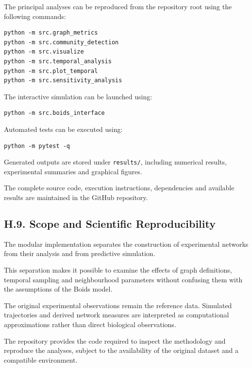\documentclass[10pt,a4paper]{article}
\begin{document}
The principal analyses can be reproduced from
the repository root using the following commands:

\begin{verbatim}
python -m src.graph_metrics
python -m src.community_detection
python -m src.visualize
python -m src.temporal_analysis
python -m src.plot_temporal
python -m src.sensitivity_analysis
\end{verbatim}

The interactive simulation can be launched using:

\begin{verbatim}
python -m src.boids_interface
\end{verbatim}

Automated tests can be executed using:

\begin{verbatim}
python -m pytest -q
\end{verbatim}

Generated outputs are stored under
\texttt{results/}, including numerical results,
experimental summaries and graphical figures.

The complete source code, execution instructions,
dependencies and available results are maintained
in the GitHub repository.

\subsection*{H.9. Scope and Scientific Reproducibility}

The modular implementation separates the
construction of experimental networks from
their analysis and from predictive simulation.

This separation makes it possible to examine
the effects of graph definitions, temporal
sampling and neighbourhood parameters without
confusing them with the assumptions of the
Boids model.

The original experimental observations remain
the reference data. Simulated trajectories
and derived network measures are interpreted
as computational approximations rather than
direct biological observations.

The repository provides the code required to
inspect the methodology and reproduce the
analyses, subject to the availability of the
original dataset and a compatible environment.


\end{document}
